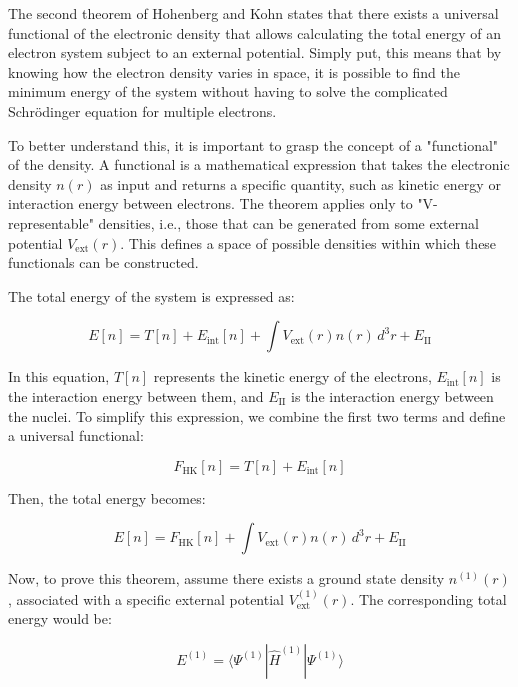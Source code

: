 \documentclass[%
 preprint, linenumbers,
 amsmath,amssymb,
 aps, physrev,
]{revtex4-2}
\begin{document}
The second theorem of Hohenberg and Kohn states that there exists a universal functional of the electronic density that allows calculating the total energy of an electron system subject to an external potential. Simply put, this means that by knowing how the electron density varies in space, it is possible to find the minimum energy of the system without having to solve the complicated Schrödinger equation for multiple electrons.

To better understand this, it is important to grasp the concept of a "functional" of the density. A functional is a mathematical expression that takes the electronic density \( n(r) \) as input and returns a specific quantity, such as kinetic energy or interaction energy between electrons. The theorem applies only to "V-representable" densities, i.e., those that can be generated from some external potential \( V_{\text{ext}}(r) \). This defines a space of possible densities within which these functionals can be constructed.

The total energy of the system is expressed as:

\begin{equation}
E[n] = T[n] + E_{\text{int}}[n] + \int V_{\text{ext}}(r)n(r) \, d^3r + E_{\text{II}}
\end{equation}

In this equation, \( T[n] \) represents the kinetic energy of the electrons, \( E_{\text{int}}[n] \) is the interaction energy between them, and \( E_{\text{II}} \) is the interaction energy between the nuclei. To simplify this expression, we combine the first two terms and define a universal functional:

\begin{equation}
F_{\text{HK}}[n] = T[n] + E_{\text{int}}[n]
\end{equation}

Then, the total energy becomes:

\begin{equation}
E[n] = F_{\text{HK}}[n] + \int V_{\text{ext}}(r)n(r) \, d^3r + E_{\text{II}}
\end{equation}

Now, to prove this theorem, assume there exists a ground state density \( n^{(1)}(r) \), associated with a specific external potential \( V_{\text{ext}}^{(1)}(r) \). The corresponding total energy would be:

\begin{equation}
E^{(1)} = \langle \Psi^{(1)} | \hat{H}^{(1)} | \Psi^{(1)} \rangle
\end{equation}
\end{document}
